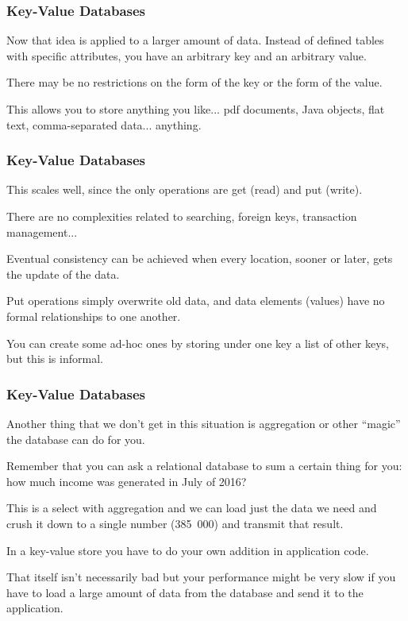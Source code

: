 \begin{frame}
\frametitle{Key-Value Databases}

Now that idea is applied to a larger amount of data. Instead of defined tables with specific attributes, you have an arbitrary key and an arbitrary value. 

There may be no restrictions on the form of the key or the form of the value.

This allows you to store anything you like... pdf documents, Java objects, flat text, comma-separated data... anything.


\end{frame}



\begin{frame}
\frametitle{Key-Value Databases}

This scales well, since the only operations are get (read) and put (write). 

There are no complexities related to searching, foreign keys, transaction management...

Eventual consistency can be achieved when every location, sooner or later, gets the update of the data. 

Put operations simply overwrite old data, and data elements (values) have no formal relationships to one another. 

You can create some ad-hoc ones by storing under one key a list of other keys, but this is informal.


\end{frame}



\begin{frame}
\frametitle{Key-Value Databases}

Another thing that we don't get in this situation is aggregation or other ``magic'' the database can do for you. 

Remember that you can ask a relational database to sum a certain thing for you: how much income was generated in July of 2016? 

This is a select with aggregation and we can load just the data we need and crush it down to a single number (385~000) and transmit that result. 

In a key-value store you have to do your own addition in application code. 

That itself isn't necessarily bad but your performance might be very slow if you have to load a large amount of data from the database and send it to the application. 

\end{frame}


